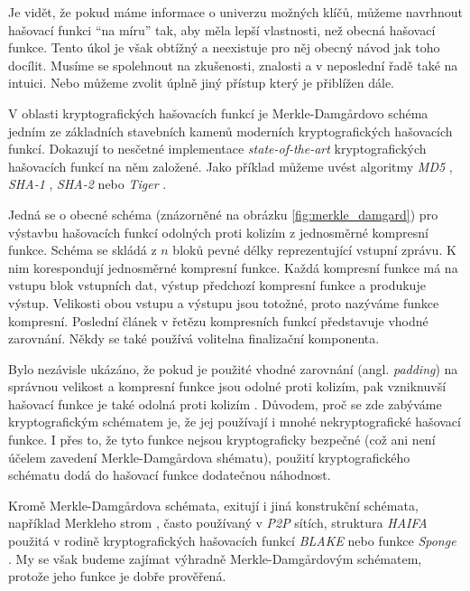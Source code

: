 Je vidět, že pokud máme informace o univerzu možných klíčů, můžeme navrhnout
hašovací funkci ``na míru'' tak, aby měla lepší vlastnosti, než obecná
hašovací funkce. Tento úkol je však obtížný a neexistuje pro něj obecný
návod jak toho docílit. Musíme se spolehnout na zkušenosti, znalosti a v 
neposlední řadě také na intuici. Nebo můžeme zvolit úplně jiný přístup
který je přiblížen dále.

V oblasti kryptografických hašovacích funkcí je Merkle-Damg\r{a}rdovo schéma \cite{merkle0} jedním ze základních
stavebních kamenů moderních kryptografických hašovacích funkcí.
Dokazují to nesčetné implementace \textit{state-of-the-art} kryptografických hašovacích funkcí na něm založené. Jako
příklad můžeme uvést algoritmy \textit{MD5} \cite{rfc1321}, \textit{SHA-1} \cite{rfc3174},
\textit{SHA-2} \cite{rfc4634} nebo \textit{Tiger} \cite{tiger}.

Jedná se o obecné schéma (znázorněné na obrázku \ref{fig:merkle_damgard}) pro výstavbu hašovacích funkcí odolných proti kolizím z jednosměrné
kompresní funkce. Schéma se skládá z $n$ bloků pevné délky reprezentující vstupní zprávu.
K nim korespondují jednosměrné kompresní funkce. Každá kompresní funkce má na vstupu blok vstupních dat,
výstup předchozí kompresní funkce a produkuje výstup. Velikosti obou vstupu a výstupu jsou totožné,
proto nazýváme funkce kompresní. Poslední článek v řetězu kompresních funkcí představuje vhodné 
zarovnání. Někdy se také používá volitelna finalizační komponenta.

Bylo nezávisle ukázáno, že pokud je použité vhodné zarovnání
(angl. \textit{padding}) na správnou velikost a kompresní funkce jsou odolné
proti kolizím, pak vzniknuvší hašovací funkce je také odolná proti kolizím \cite{damgard0}.
Důvodem, proč se zde zabýváme kryptografickým schématem je, že jej používají i mnohé nekryptografické
hašovací funkce. I přes to, že tyto funkce nejsou kryptograficky bezpečné (což ani není účelem zavedení
Merkle-Damg\r{a}rdova shématu), použití kryptografického schématu dodá do hašovací funkce dodatečnou 
náhodnost.

Kromě Merkle-Damg\r{a}rdova schémata, exitují i jiná konstrukční schémata, například Merkleho strom 
\cite{merkle1}, často používaný v \textit{P2P} sítích,
struktura \textit{HAIFA} \cite{haifa} použitá v rodině kryptografických hašovacích funkcí \textit{BLAKE}
nebo funkce \textit{Sponge} \cite{sponge}. My se však budeme zajímat výhradně Merkle-Damg\r{a}rdovým
schématem, protože jeho funkce je dobře prověřená.

